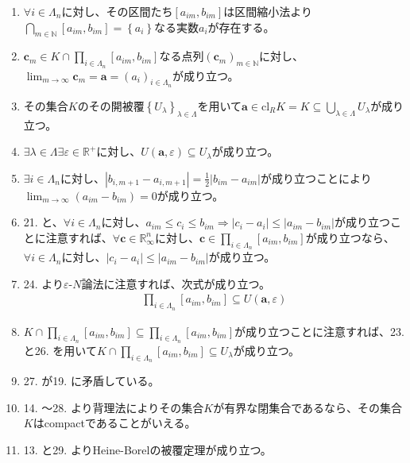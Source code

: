 \documentclass[dvipdfmx]{jsarticle}
\begin{document}
\begin{enumerate}
\begin{itemize}
\end{itemize}
\item
  $\forall i \in \varLambda_{n}$に対し、その区間たち$\left[ a_{im},b_{im} \right]$は区間縮小法より$\bigcap_{m \in \mathbb{N}} \left[ a_{im},b_{im} \right] = \left\{ a_{i} \right\}$なる実数$a_{i}$が存在する。
\item
  $\mathbf{c}_{m} \in K \cap \prod_{i \in \varLambda_{n}} \left[ a_{im},b_{im} \right]$なる点列$\left( \mathbf{c}_{m} \right)_{m \in \mathbb{N}}$に対し、$\lim_{m \rightarrow \infty}\mathbf{c}_{m} = \mathbf{a} = \left( a_{i} \right)_{i \in \varLambda_{n}}$が成り立つ。
\item
  その集合$K$のその開被覆$\left\{ U_{\lambda} \right\}_{\lambda \in \varLambda}$を用いて$\mathbf{a} \in \mathrm{cl}_{R}K = K \subseteq \bigcup_{\lambda \in \varLambda} U_{\lambda}$が成り立つ。
\item
  $\exists\lambda \in \varLambda\exists\varepsilon \in \mathbb{R}^{+}$に対し、$U\left( \mathbf{a},\varepsilon \right) \subseteq U_{\lambda}$が成り立つ。
\item
  $\exists i \in \varLambda_{n}$に対し、$\left| b_{i,m + 1} - a_{i,m + 1} \right| = \frac{1}{2}\left| b_{im} - a_{im} \right|$が成り立つことにより$\lim_{m \rightarrow \infty}\left( a_{im} - b_{im} \right) = 0$が成り立つ。
\item
  21. と、$\forall i \in \varLambda_{n}$に対し、$a_{im} \leq c_{i} \leq b_{im} \Rightarrow \left| c_{i} - a_{i} \right| \leq \left| a_{im} - b_{im} \right|$が成り立つことに注意すれば、$\forall\mathbf{c} \in \mathbb{R}_{\infty}^{n}$に対し、$\mathbf{c} \in \prod_{i \in \varLambda_{n}} \left[ a_{im},b_{im} \right]$が成り立つなら、$\forall i \in \varLambda_{n}$に対し、$\left| c_{i} - a_{i} \right| \leq \left| a_{im} - b_{im} \right|$が成り立つ。
\item
  24. より$\varepsilon$-$N$論法に注意すれば、次式が成り立つ。
\begin{align*}
\prod_{i \in \varLambda_{n}} \left[ a_{im},b_{im} \right] \subseteq U\left( \mathbf{a},\varepsilon \right)
\end{align*}
\item
  $K \cap \prod_{i \in \varLambda_{n}} \left[ a_{im},b_{im} \right] \subseteq \prod_{i \in \varLambda_{n}} \left[ a_{im},b_{im} \right]$が成り立つことに注意すれば、23. と26. を用いて$K \cap \prod_{i \in \varLambda_{n}} \left[ a_{im},b_{im} \right] \subseteq U_{\lambda}$が成り立つ。
\item
  27. が19. に矛盾している。
\item
  14. ～28. より背理法によりその集合$K$が有界な閉集合であるなら、その集合$K$はcompactであることがいえる。
\item
  13. と29. よりHeine-Borelの被覆定理が成り立つ。
\end{enumerate}
\end{document}
